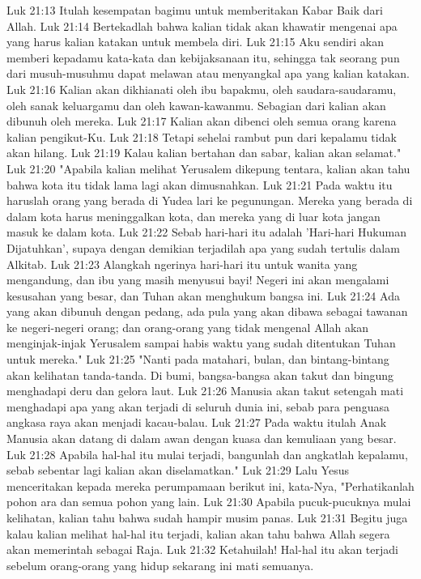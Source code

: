 Luk 21:13  Itulah kesempatan bagimu untuk memberitakan Kabar Baik dari Allah.
Luk 21:14  Bertekadlah bahwa kalian tidak akan khawatir mengenai apa yang harus kalian katakan untuk membela diri.
Luk 21:15  Aku sendiri akan memberi kepadamu kata-kata dan kebijaksanaan itu, sehingga tak seorang pun dari musuh-musuhmu dapat melawan atau menyangkal apa yang kalian katakan.
Luk 21:16  Kalian akan dikhianati oleh ibu bapakmu, oleh saudara-saudaramu, oleh sanak keluargamu dan oleh kawan-kawanmu. Sebagian dari kalian akan dibunuh oleh mereka.
Luk 21:17  Kalian akan dibenci oleh semua orang karena kalian pengikut-Ku.
Luk 21:18  Tetapi sehelai rambut pun dari kepalamu tidak akan hilang.
Luk 21:19  Kalau kalian bertahan dan sabar, kalian akan selamat."
Luk 21:20  "Apabila kalian melihat Yerusalem dikepung tentara, kalian akan tahu bahwa kota itu tidak lama lagi akan dimusnahkan.
Luk 21:21  Pada waktu itu haruslah orang yang berada di Yudea lari ke pegunungan. Mereka yang berada di dalam kota harus meninggalkan kota, dan mereka yang di luar kota jangan masuk ke dalam kota.
Luk 21:22  Sebab hari-hari itu adalah 'Hari-hari Hukuman Dijatuhkan', supaya dengan demikian terjadilah apa yang sudah tertulis dalam Alkitab.
Luk 21:23  Alangkah ngerinya hari-hari itu untuk wanita yang mengandung, dan ibu yang masih menyusui bayi! Negeri ini akan mengalami kesusahan yang besar, dan Tuhan akan menghukum bangsa ini.
Luk 21:24  Ada yang akan dibunuh dengan pedang, ada pula yang akan dibawa sebagai tawanan ke negeri-negeri orang; dan orang-orang yang tidak mengenal Allah akan menginjak-injak Yerusalem sampai habis waktu yang sudah ditentukan Tuhan untuk mereka."
Luk 21:25  "Nanti pada matahari, bulan, dan bintang-bintang akan kelihatan tanda-tanda. Di bumi, bangsa-bangsa akan takut dan bingung menghadapi deru dan gelora laut.
Luk 21:26  Manusia akan takut setengah mati menghadapi apa yang akan terjadi di seluruh dunia ini, sebab para penguasa angkasa raya akan menjadi kacau-balau.
Luk 21:27  Pada waktu itulah Anak Manusia akan datang di dalam awan dengan kuasa dan kemuliaan yang besar.
Luk 21:28  Apabila hal-hal itu mulai terjadi, bangunlah dan angkatlah kepalamu, sebab sebentar lagi kalian akan diselamatkan."
Luk 21:29  Lalu Yesus menceritakan kepada mereka perumpamaan berikut ini, kata-Nya, "Perhatikanlah pohon ara dan semua pohon yang lain.
Luk 21:30  Apabila pucuk-pucuknya mulai kelihatan, kalian tahu bahwa sudah hampir musim panas.
Luk 21:31  Begitu juga kalau kalian melihat hal-hal itu terjadi, kalian akan tahu bahwa Allah segera akan memerintah sebagai Raja.
Luk 21:32  Ketahuilah! Hal-hal itu akan terjadi sebelum orang-orang yang hidup sekarang ini mati semuanya.

